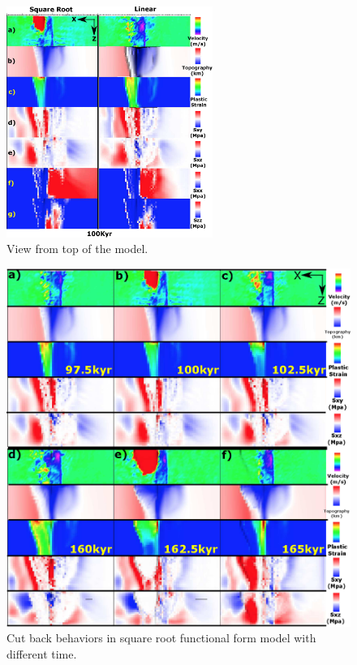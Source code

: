 \begin{figure}[hc]
  \centering
    \includegraphics[width=0.6\textwidth]{fig_Results4_3_sqrt_vs_lin_cut_back_100kyr.eps}
  \caption{View from top of the model.}
 \label{fig_Results4_3_2}
\end{figure} 

\begin{figure}[hc]
  \centering
    \includegraphics[width=1.0\textwidth]{fig_Results4_4_sqrt_cut_back_with_time.eps}
  \caption{Cut back behaviors in square root functional form model with different time.}
 \label{fig_Results4_4}
\end{figure}   

